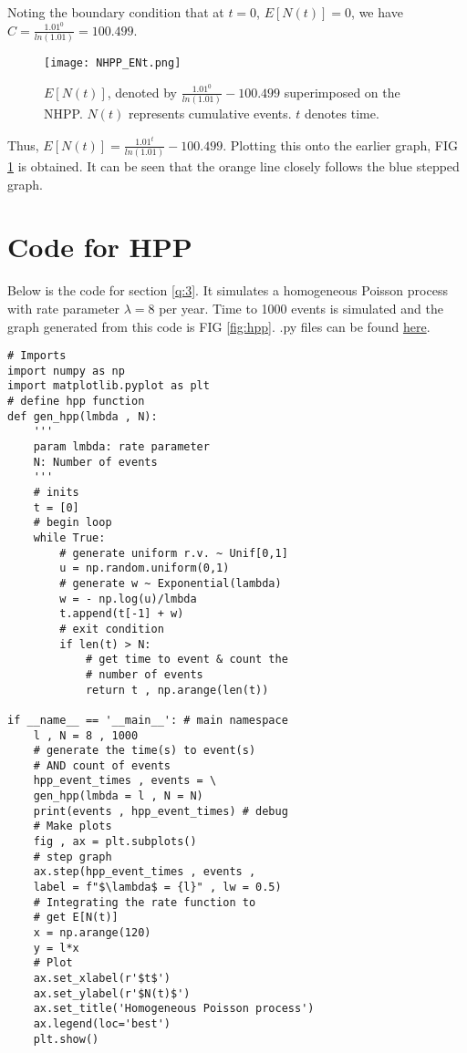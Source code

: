 \documentclass[%
 reprint,
 amsmath,amssymb,
 aps,
]{revtex4-2}
\theoremstyle{definition}
\begin{document}
Noting the boundary condition that at $t=0$, $E[N(t)]=0$, we have $C = \frac{1.01^0}{ln(1.01)} = 100.499$.\\

\begin{figure}[H]
\centering
\texttt{[image: NHPP\_ENt.png]}
\caption{\label{fig:nhppent}$E[N(t)]$, denoted by $\frac{1.01^0}{ln(1.01)} - 100.499$ superimposed on the NHPP. $N(t)$ represents cumulative events. $t$ denotes time.}
\end{figure}

Thus,  $E[N(t)] = \frac{1.01^t}{ln(1.01)} - 100.499$. Plotting this onto the earlier graph, FIG \ref{fig:nhppent} is obtained. It can be seen that the orange line closely follows the blue stepped graph.

\appendix

\section{\label{app:hppcode}Code for HPP}
Below is the code for section \ref{q:3}. It simulates a homogeneous Poisson process with rate parameter $\lambda=8$ per year. Time to 1000 events is simulated and the graph generated from this code is FIG \ref{fig:hpp}. .py files can be found \href{https://github.com/sourasen1011/Stochastic_Processes/blob/main/CA3/project_helper/HPP.py}{here}.
\begin{verbatim}
# Imports
import numpy as np
import matplotlib.pyplot as plt
# define hpp function
def gen_hpp(lmbda , N):
    '''
    param lmbda: rate parameter
    N: Number of events
    '''
    # inits
    t = [0]
    # begin loop
    while True:
        # generate uniform r.v. ~ Unif[0,1]
        u = np.random.uniform(0,1)
        # generate w ~ Exponential(lambda)
        w = - np.log(u)/lmbda
        t.append(t[-1] + w)
        # exit condition
        if len(t) > N:
            # get time to event & count the
            # number of events
            return t , np.arange(len(t))

if __name__ == '__main__': # main namespace
    l , N = 8 , 1000
    # generate the time(s) to event(s)
    # AND count of events
    hpp_event_times , events = \
    gen_hpp(lmbda = l , N = N)
    print(events , hpp_event_times) # debug
    # Make plots
    fig , ax = plt.subplots()
    # step graph
    ax.step(hpp_event_times , events ,
    label = f"$\lambda$ = {l}" , lw = 0.5)
    # Integrating the rate function to 
    # get E[N(t)]
    x = np.arange(120)
    y = l*x
    # Plot
    ax.set_xlabel(r'$t$')
    ax.set_ylabel(r'$N(t)$')
    ax.set_title('Homogeneous Poisson process')
    ax.legend(loc='best')
    plt.show()
\end{verbatim}
\end{document}
